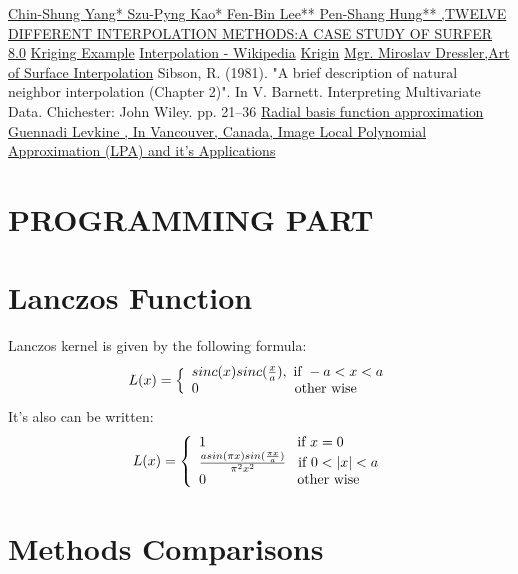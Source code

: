\documentclass{article}
\begin{document}
\begin{multicols*}{2}
\begin{thebibliography}{9}
	\href{http://www.isprs.org/proceedings/xxxv/congress/comm2/papers/231.pdf}{Chin-Shung Yang* Szu-Pyng Kao* Fen-Bin Lee** Pen-Shang Hung** ,TWELVE DIFFERENT INTERPOLATION METHODS:A CASE STUDY OF SURFER 8.0}
	\href{http://www.imm.dtu.dk/~alan/krexample.pdf}{Kriging Example}
	\href{https://en.wikipedia.org/wiki/Interpolation}{Interpolation - Wikipedia}
	\href{http://people.ku.edu/~gbohling/cpe940/Kriging.pdf}{Krigin}
	\href{http://m.dressler.sweb.cz/AOSIM.pdf}{Mgr. Miroslav Dressler,Art of Surface Interpolation}
	Sibson, R. (1981). "A brief description of natural neighbor interpolation (Chapter 2)". In V. Barnett. Interpreting Multivariate Data. Chichester: John Wiley. pp. 21–36
	\href{https://en.wikipedia.org/wiki/Radial_basis_function#Approximation}{Radial basis function approximation}
	\href{http://www.hlevkin.com/articles/Local_polynomial_approximation.pdf}{Guennadi Levkine , In Vancouver, Canada, Image Local Polynomial Approximation (LPA) and it's Applications}
\end{thebibliography}
\end{multicols*}
\newpage
{\Huge{\centering\section*{PROGRAMMING PART}}}


\section*{Lanczos Function}
Lanczos kernel is given by the following formula:
\[L(x) = \Big\lbrace \begin{array}{ll}
sinc(x)sinc(\frac{x}{a})  , \text{ if } -a<x<a\\
0  \text{\hspace{23mm} other wise}
\end{array} \]
It's also can be written: 
\[
L(x) = \left\lbrace
\begin{array}{ll}
1 \hspace{23mm} \text{if } x=0\\
\frac{asin(\pi x)sin(\frac{\pi x}{a})}{\pi^2x^2} \hspace{3mm} \text{if } 0<|x|<a\\
0 \hspace{23mm} \text{other wise}
\end{array} \right.
\]

\section*{Methods Comparisons}
\end{document}
